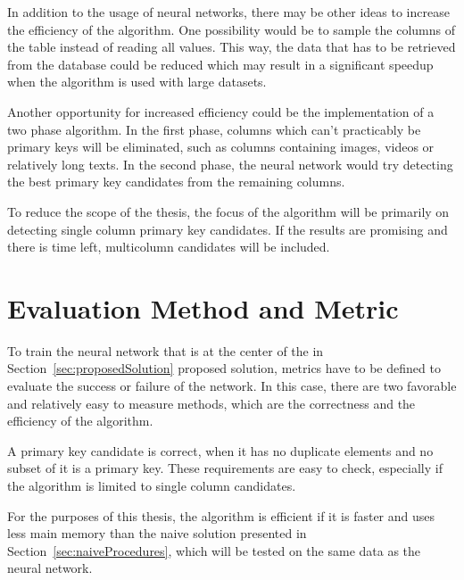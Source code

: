 \documentclass[a4paper]{article}
\begin{document}
In addition to the usage of neural networks, there may be other ideas to increase the efficiency of the algorithm. One possibility would be to sample the columns of the table instead of reading all values. This way, the data that has to be retrieved from the database could be reduced which may result in a significant speedup when the algorithm is used with large datasets.

Another opportunity for increased efficiency could be the implementation of a two phase algorithm. In the first phase, columns which can't practicably be primary keys will be eliminated, such as columns containing images, videos or relatively long texts. In the second phase, the neural network would try detecting the best primary key candidates from the remaining columns.

To reduce the scope of the thesis, the focus of the algorithm will be primarily on detecting single column primary key candidates. If the results are promising and there is time left, multicolumn candidates will be included.

\section{Evaluation Method and Metric}
To train the neural network that is at the center of the in Section~\ref{sec:proposedSolution} proposed solution, metrics have to be defined to evaluate the success or failure of the network. In this case, there are two favorable and relatively easy to measure methods, which are the correctness and the efficiency of the algorithm.

A primary key candidate is correct, when it has no duplicate elements and no subset of it is a primary key. These requirements are easy to check, especially if the algorithm is limited to single column candidates.

For the purposes of this thesis, the algorithm is efficient if it is faster and uses less main memory than the naive solution presented in Section~\ref{sec:naiveProcedures}, which will be tested on the same data as the neural network.
\end{document}
